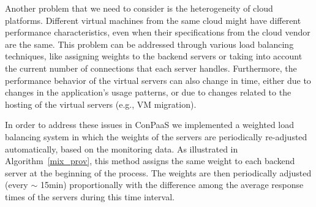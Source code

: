 Another problem that we need to consider is the heterogeneity of cloud platforms.
Different virtual machines from the same cloud might have different performance
characteristics, even when their specifications from the cloud vendor are the same.
This problem can be addressed through various load balancing techniques, like
assigning weights to the backend servers or taking into account the current number
of connections that each server handles. Furthermore, the performance behavior
of the virtual servers can also change in time, either due to changes in
the application's usage patterns, or due to changes related to the hosting
of the virtual servers (e.g., VM migration).

In order to address these issues in ConPaaS we implemented a weighted load balancing
system in which the weights of the servers are periodically re-adjusted
automatically, based on the monitoring data. As illustrated in 
Algorithm~\ref{mix_prov}, this method assigns the same weight to each 
backend server at the beginning of the process. The weights are then periodically
adjusted (every $\sim$ 15min) proportionally with the difference among the
average response times of the servers during this time interval.



